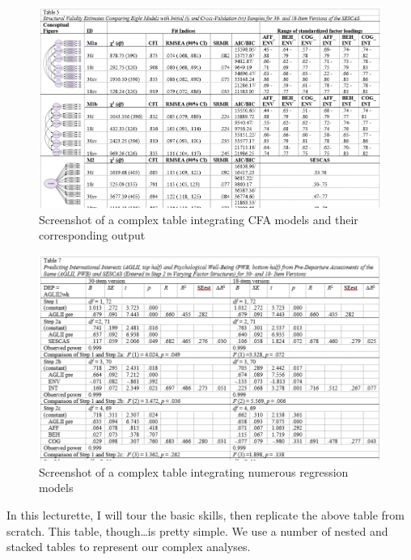 \documentclass[
  english,
]{book}
\begin{document}
\begin{figure}
\centering
\includegraphics{images/TableMagic/CFAtable.png}
\caption{Screenshot of a complex table integrating CFA models and their corresponding output}
\end{figure}

\begin{figure}
\centering
\includegraphics{images/TableMagic/RegTable.png}
\caption{Screenshot of a complex table integrating numerous regression models}
\end{figure}

In this lecturette, I will tour the basic skills, then replicate the above table from scratch. This table, though\ldots is pretty simple. We use a number of nested and stacked tables to represent our complex analyses.
\end{document}
